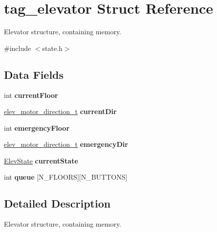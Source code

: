 \hypertarget{structtag__elevator}{}\section{tag\+\_\+elevator Struct Reference}
\label{structtag__elevator}


Elevator structure, containing memory.  




{\ttfamily \#include $<$state.\+h$>$}

\subsection*{Data Fields}
\begin{DoxyCompactItemize}
\item 
\mbox{\label{structtag__elevator_ab8d079cd5c67b9cab2084739e23e5767}} 
int {\bfseries current\+Floor}
\item 
\mbox{\label{structtag__elevator_afdd3e36be7cd9360b6b186fdb3715e64}} 
\mbox{\hyperlink{elev_8h_a2256dfd58fecce253106f83fd2ed607f}{elev\+\_\+motor\+\_\+direction\+\_\+t}} {\bfseries current\+Dir}
\item 
\mbox{\label{structtag__elevator_ad0ba62d2cd31bb00fa02b8b2992172e0}} 
int {\bfseries emergency\+Floor}
\item 
\mbox{\label{structtag__elevator_ae9003095526b845b145f7db9cd95c9dd}} 
\mbox{\hyperlink{elev_8h_a2256dfd58fecce253106f83fd2ed607f}{elev\+\_\+motor\+\_\+direction\+\_\+t}} {\bfseries emergency\+Dir}
\item 
\mbox{\label{structtag__elevator_afc2a79cf490fa3b52c52c309da4b61b6}} 
\mbox{\hyperlink{state_8h_a3ba496a58538f02dfa238b58a26f3501}{Elev\+State}} {\bfseries current\+State}
\item 
\mbox{\label{structtag__elevator_a1a603fb3c13454fc97598b347944d6c0}} 
int {\bfseries queue} \mbox{[}N\+\_\+\+F\+L\+O\+O\+RS\mbox{]}\mbox{[}N\+\_\+\+B\+U\+T\+T\+O\+NS\mbox{]}
\end{DoxyCompactItemize}


\subsection{Detailed Description}
Elevator structure, containing memory. 

